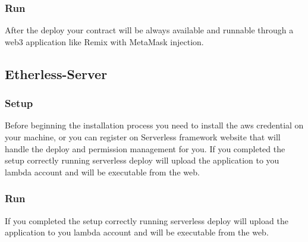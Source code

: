 \subsubsection{Run}
After the deploy your contract will be always available and runnable through a web3 application like Remix with MetaMask injection.
\subsection{Etherless-Server}
\subsubsection{Setup}
Before beginning the installation process you need to install the aws credential on your machine, or you can register on Serverless framework website that will handle the deploy and permission management for you.
If you completed the setup correctly running serverless deploy will upload the application to you lambda account and will be executable from the web.
\subsubsection{Run}
If you completed the setup correctly running serverless deploy will upload the application to you lambda account and will be executable from the web.
